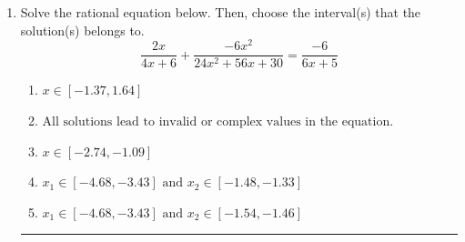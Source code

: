 \documentclass[14pt]{extbook}
\newcommand{\litem}[1]{\item#1\hspace*{-1cm}\rule{\textwidth}{0.4pt}}
\begin{document}
\begin{enumerate}
{\begin{enumerate}[label=\Alph*.]
\end{enumerate} }
\litem{
Solve the rational equation below. Then, choose the interval(s) that the solution(s) belongs to.\[ \frac{2x}{4x + 6} + \frac{-6x^{2}}{24x^{2} +56 x + 30} = \frac{-6}{6x + 5} \]\begin{enumerate}[label=\Alph*.]
\item \( x \in [-1.37,1.64] \)
\item \( \text{All solutions lead to invalid or complex values in the equation.} \)
\item \( x \in [-2.74,-1.09] \)
\item \( x_1 \in [-4.68, -3.43] \text{ and } x_2 \in [-1.48,-1.33] \)
\item \( x_1 \in [-4.68, -3.43] \text{ and } x_2 \in [-1.54,-1.46] \)

\end{enumerate} }
\end{enumerate}
\end{document}
